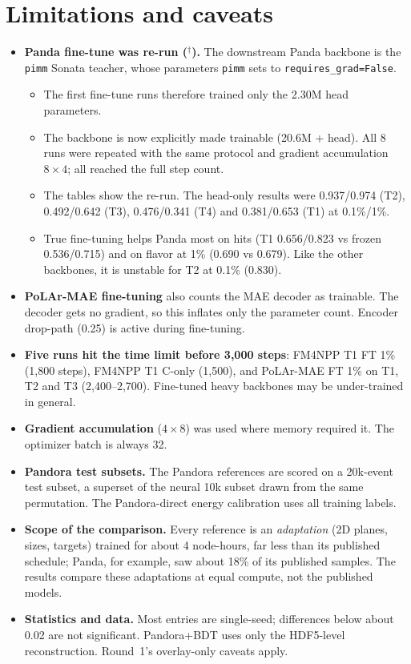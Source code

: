 \documentclass[11pt,a4paper]{article}
\newcommand{\code}[1]{\texttt{\small #1}}
\newcommand{\pft}{\ensuremath{^\dagger}}
\begin{document}
\section{Limitations and caveats}\label{sec:caveats}
\begin{itemize}[leftmargin=*]
\item \textbf{Panda fine-tune was re-run (\pft).} The downstream Panda backbone is the \code{pimm} Sonata teacher, whose parameters \code{pimm} sets to \code{requires\_grad=False}.
  \begin{itemize}
    \item The first fine-tune runs therefore trained only the 2.30M head parameters.
    \item The backbone is now explicitly made trainable (20.6M + head). All 8 runs were repeated with the same protocol and gradient accumulation $8\times4$; all reached the full step count.
    \item The tables show the re-run. The head-only results were 0.937/0.974 (T2), 0.492/0.642 (T3), 0.476/0.341 (T4) and 0.381/0.653 (T1) at 0.1\%/1\%.
    \item True fine-tuning helps Panda most on hits (T1 0.656/0.823 vs frozen 0.536/0.715) and on flavor at 1\% (0.690 vs 0.679). Like the other backbones, it is unstable for T2 at 0.1\% (0.830).
  \end{itemize}
\item \textbf{PoLAr-MAE fine-tuning} also counts the MAE decoder as trainable. The decoder gets no gradient, so this inflates only the parameter count. Encoder drop-path (0.25) is active during fine-tuning.
\item \textbf{Five runs hit the time limit before 3{,}000 steps}: FM4NPP T1 FT 1\% (1{,}800 steps), FM4NPP T1 C-only (1{,}500), and PoLAr-MAE FT 1\% on T1, T2 and T3 (2{,}400--2{,}700). Fine-tuned heavy backbones may be under-trained in general.
\item \textbf{Gradient accumulation} ($4\times8$) was used where memory required it. The optimizer batch is always 32.
\item \textbf{Pandora test subsets.} The Pandora references are scored on a 20k-event test subset, a superset of the neural 10k subset drawn from the same permutation. The Pandora-direct energy calibration uses all training labels.
\item \textbf{Scope of the comparison.} Every reference is an \emph{adaptation} (2D planes, sizes, targets) trained for about 4 node-hours, far less than its published schedule; Panda, for example, saw about 18\% of its published samples. The results compare these adaptations at equal compute, not the published models.
\item \textbf{Statistics and data.} Most entries are single-seed; differences below about 0.02 are not significant. Pandora+BDT uses only the HDF5-level reconstruction. Round~1's overlay-only caveats apply.
\end{itemize}
\end{document}

